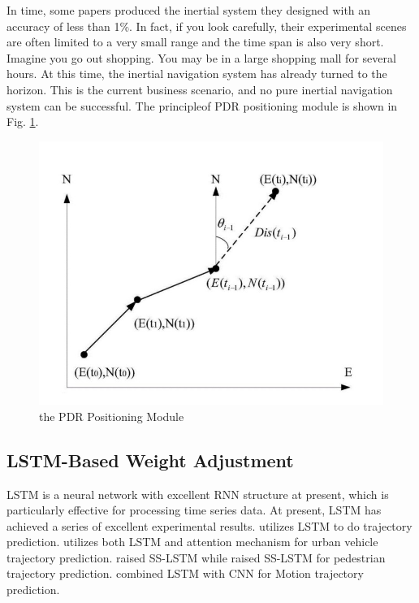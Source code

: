 \documentclass[conference]{IEEEtran}
\begin{document}
In time, some papers produced the inertial system they designed with an accuracy of less than 1\%. In fact, if you look carefully, their experimental scenes are often limited to a very small range and the time span is also very short. Imagine you go out shopping. You may be in a large shopping mall for several hours. At this time, the inertial navigation system has already turned to the horizon. This is the current business scenario, and no pure inertial navigation system can be successful. The principleof PDR positioning module is shown in Fig. \ref{fig:pdr}.

\begin{figure}[h]
	\centering
	\includegraphics[scale=0.4]{./figures/pdr.jpg}
	\caption{the PDR Positioning Module}
	\label{fig:pdr}
\end{figure}

\subsection{LSTM-Based Weight Adjustment}
LSTM \cite{lstm} is a neural network with excellent RNN structure at present, which is particularly effective for processing time series data. At present, LSTM has achieved a series of excellent experimental results. \cite{lstm-1} utilizes LSTM to do trajectory prediction. \cite{lstm-attention} utilizes both LSTM and attention mechanism for urban vehicle trajectory prediction. \cite{lstm-sr} raised SS-LSTM while \cite{lstm-ss} raised SS-LSTM for pedestrian trajectory prediction. \cite{lstm-cnn} combined LSTM with CNN for Motion trajectory prediction.
\end{document}
